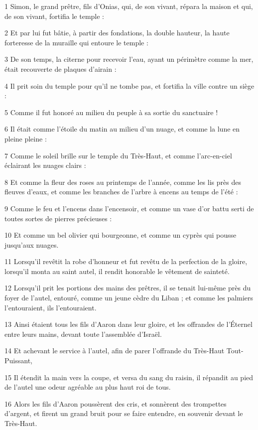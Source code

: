 
\par 1 Simon, le grand prêtre, fils d'Onias, qui, de son vivant, répara la maison et qui, de son vivant, fortifia le temple :
\par 2 Et par lui fut bâtie, à partir des fondations, la double hauteur, la haute forteresse de la muraille qui entoure le temple :
\par 3 De son temps, la citerne pour recevoir l'eau, ayant un périmètre comme la mer, était recouverte de plaques d'airain :
\par 4 Il prit soin du temple pour qu'il ne tombe pas, et fortifia la ville contre un siège :
\par 5 Comme il fut honoré au milieu du peuple à sa sortie du sanctuaire !
\par 6 Il était comme l'étoile du matin au milieu d'un nuage, et comme la lune en pleine pleine :
\par 7 Comme le soleil brille sur le temple du Très-Haut, et comme l'arc-en-ciel éclairant les nuages ​​clairs :
\par 8 Et comme la fleur des roses au printemps de l'année, comme les lis près des fleuves d'eaux, et comme les branches de l'arbre à encens au temps de l'été :
\par 9 Comme le feu et l'encens dans l'encensoir, et comme un vase d'or battu serti de toutes sortes de pierres précieuses :
\par 10 Et comme un bel olivier qui bourgeonne, et comme un cyprès qui pousse jusqu'aux nuages.
\par 11 Lorsqu'il revêtit la robe d'honneur et fut revêtu de la perfection de la gloire, lorsqu'il monta au saint autel, il rendit honorable le vêtement de sainteté.
\par 12 Lorsqu'il prit les portions des mains des prêtres, il se tenait lui-même près du foyer de l'autel, entouré, comme un jeune cèdre du Liban ; et comme les palmiers l'entouraient, ils l'entouraient.
\par 13 Ainsi étaient tous les fils d'Aaron dans leur gloire, et les offrandes de l'Éternel entre leurs mains, devant toute l'assemblée d'Israël.
\par 14 Et achevant le service à l'autel, afin de parer l'offrande du Très-Haut Tout-Puissant,
\par 15 Il étendit la main vers la coupe, et versa du sang du raisin, il répandit au pied de l'autel une odeur agréable au plus haut roi de tous.
\par 16 Alors les fils d'Aaron poussèrent des cris, et sonnèrent des trompettes d'argent, et firent un grand bruit pour se faire entendre, en souvenir devant le Très-Haut.

